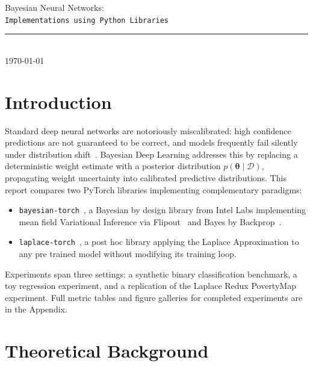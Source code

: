 \documentclass[12pt,a4paper]{article}
\newcommand{\btheta}{\bm{\theta}}
\newcommand{\cD}{\mathcal{D}}
\begin{document}
\begin{titlepage}
  \centering\vspace*{2cm}
  {\LARGE Bayesian Neural Networks:\\[4pt]
   \texttt{Implementations using Python Libraries}\par}
  \vspace{0.8cm}
  \vspace{2cm}
  \rule{0.7\linewidth}{0.4pt}\\[0.4cm]
  {\normalsize\today}
\end{titlepage}

\tableofcontents
\newpage

\section{Introduction}
\label{sec:intro}

Standard deep neural networks are notoriously miscalibrated: high confidence
predictions are not guaranteed to be correct, and models frequently fail
silently under distribution shift~\citep{goan2020bayesian,murphy2023pml}.
Bayesian Deep Learning addresses this by replacing a deterministic weight
estimate with a posterior distribution $p(\btheta \mid \cD)$, propagating weight
uncertainty into calibrated predictive distributions.
This report compares two PyTorch libraries implementing complementary paradigms:
\begin{itemize}[leftmargin=*]
  \item \texttt{bayesian-torch}~\citep{intel2021bayesiantorch}, a
        Bayesian by design library from Intel Labs implementing mean field
        Variational Inference via Flipout~\citep{wen2018flipout} and
        Bayes by Backprop~\citep{blundell2015weight}.
  \item \texttt{laplace-torch}~\citep{daxberger2021laplace,aleximmer2024laplace},
        a post hoc library applying the Laplace Approximation to any
        pre trained model without modifying its training loop.
\end{itemize}

Experiments span three settings: a synthetic binary classification
benchmark, a toy regression
experiment, and a replication of the
Laplace Redux PovertyMap experiment.
Full metric tables and figure galleries for completed experiments are in the
Appendix.

\section{Theoretical Background}
\label{sec:theory}
\end{document}
